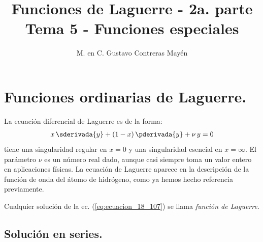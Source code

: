 

\title{Funciones de Laguerre - 2a. parte \\ \large {Tema 5 - Funciones especiales} \vspace{-3ex}}
\author{M. en C. Gustavo Contreras Mayén}
\date{ }

\pagestyle{fancy}
\fancyhf{}
\lhead{\leftmark}
\rfoot{\thepage}
\setlength{\headheight}{16pt}%

\def\changemargin#1#2{\list{}{\rightmargin#2\leftmargin#1}\item[]}
\let\endchangemargin=\endlist 



\maketitle
\fontsize{14}{14}\selectfont
\tableofcontents
\newpage

\section{Funciones ordinarias de Laguerre.}\label{sec:seccion_01}

La ecuación diferencial de Laguerre es de la forma:
\begin{align}
x \, \sderivada{y} + (1 - x) \, \pderivada{y} + \nu \, y = 0
\label{eq:ecuacion_18_107}
\end{align}
tiene una singularidad regular en $x = 0$ y una singularidad esencial en \break \hfill $x = \infty$. El parámetro $\nu$ es un número real dado, aunque casi siempre toma un valor entero en aplicaciones físicas. La ecuación de Laguerre aparece en la descripción de la función de onda del átomo de hidrógeno, como ya hemos hecho referencia previamente.
\par
Cualquier solución de la ec. (\ref{eq:ecuacion_18_107}) se llama \emph{función de Laguerre}.

\subsection{Solución en series.}

